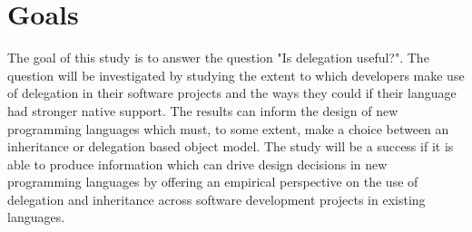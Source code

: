 \section{Goals}
The goal of this study is to answer the question "Is delegation useful?". The question will be investigated by studying the extent to which developers make use of delegation in their software projects and the ways they could if their language had stronger native support. The results can inform the design of new programming languages which must, to some extent, make a choice between an inheritance or delegation based object model. The study will be a success if it is able to produce information which can drive design decisions in new programming languages by offering an empirical perspective on the use of delegation and inheritance across software development projects in existing languages.